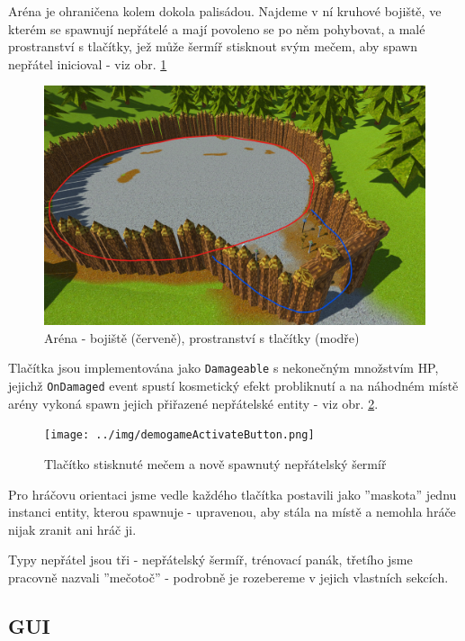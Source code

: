 Aréna je ohraničena kolem dokola palisádou. Najdeme v ní kruhové bojiště, ve kterém se spawnují nepřátelé a mají povoleno se po něm pohybovat, a malé prostranství s tlačítky, jež může šermíř stisknout svým mečem, aby spawn nepřátel inicioval - viz obr. \ref{obr05:demogameArenaLayout} 
\begin{figure}[ht]\centering
  \center
  \includegraphics[width=145mm]{../img/demogameArenaLayout.png}
  \caption{Aréna - bojiště (červeně), prostranství s tlačítky (modře)}
  \label{obr05:demogameArenaLayout}
\end{figure} 

Tlačítka jsou implementována jako \texttt{Damageable} s nekonečným množstvím \acs{HP}, jejichž \texttt{OnDamaged} event spustí kosmetický efekt probliknutí a na náhodném místě arény vykoná spawn jejich přiřazené nepřátelské entity - viz obr. \ref{obr05:demogameActivateButton}. 
\begin{figure}[h!]\centering
  \center
  \texttt{[image: ../img/demogameActivateButton.png]}
  \caption{Tlačítko stisknuté mečem a nově spawnutý nepřátelský šermíř}
  \label{obr05:demogameActivateButton}
\end{figure} 

Pro hráčovu orientaci jsme vedle každého tlačítka postavili jako ''maskota'' jednu instanci entity, kterou spawnuje - upravenou, aby stála na místě a nemohla hráče nijak zranit ani hráč ji.

Typy nepřátel jsou tři - nepřátelský šermíř, trénovací panák, třetího jsme pracovně nazvali ''mečotoč'' - podrobně je rozebereme v jejich vlastních sekcích.


\subsection{GUI}


